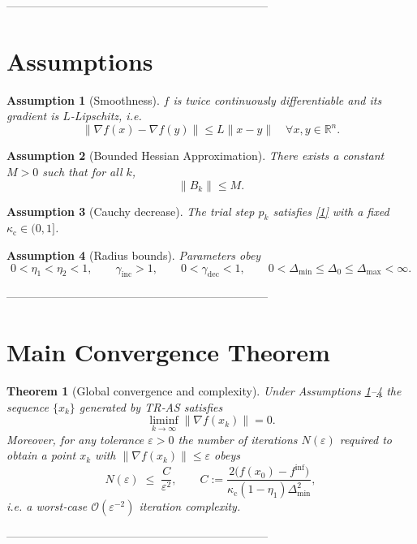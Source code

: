 \documentclass{article}
\newtheorem{theorem}{Theorem}
\newtheorem{assumption}{Assumption}
\begin{document}
---------------------------------------------------------------------

\section*{Assumptions}
\begin{assumption}[Smoothness]\label{ass:smooth}
\(f\) is twice continuously differentiable and its gradient is
\(L\)-Lipschitz, i.e.
\[
\|\nabla f(x)-\nabla f(y)\|\le L\|x-y\|\quad\forall x,y\in\mathbb{R}^{n}.
\tag{A1}
\]
\end{assumption}
\begin{assumption}[Bounded Hessian Approximation]\label{ass:hessian}
There exists a constant \(M>0\) such that for all \(k\),
\[
\|B_{k}\|\le M .
\tag{A2}
\]
\end{assumption}
\begin{assumption}[Cauchy decrease]\label{ass:cauchy}
The trial step \(p_{k}\) satisfies \eqref{1} with a fixed
\(\kappa_{\mathrm{c}}\in(0,1]\).
\end{assumption}
\begin{assumption}[Radius bounds]\label{ass:radius}
Parameters obey
\[
0<\eta_{1}<\eta_{2}<1,\qquad
\gamma_{\mathrm{inc}}>1,\qquad
0<\gamma_{\mathrm{dec}}<1,\qquad
0<\Delta_{\min}\le\Delta_{0}\le\Delta_{\max}<\infty .
\tag{A4}
\]
\end{assumption}

---------------------------------------------------------------------

\section*{Main Convergence Theorem}
\begin{theorem}[Global convergence and complexity]\label{thm:main}
Under Assumptions \ref{ass:smooth}–\ref{ass:radius} the sequence
\(\{x_{k}\}\) generated by TR‑AS satisfies
\[
\liminf_{k\to\infty}\|\nabla f(x_{k})\|=0 .
\tag{5}
\]
Moreover, for any tolerance \(\varepsilon>0\) the number of
iterations \(N(\varepsilon)\) required to obtain a point
\(x_{k}\) with \(\|\nabla f(x_{k})\|\le\varepsilon\) obeys
\[
N(\varepsilon)\;\le\;
\frac{C}{\varepsilon^{2}},
\qquad
C:=\frac{2\bigl(f(x_{0})-f^{\inf}\bigr)}{\kappa_{\mathrm{c}}(1-\eta_{1})\Delta_{\min}^{2}},
\tag{6}
\]
i.e. a worst‑case \(\mathcal{O}(\varepsilon^{-2})\) iteration complexity.
\end{theorem}

---------------------------------------------------------------------
\end{document}
